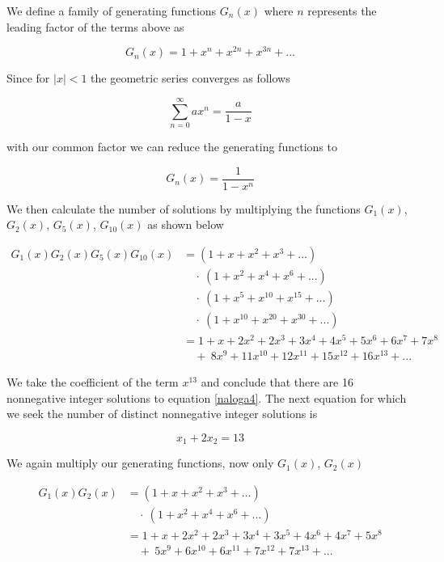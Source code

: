 \documentclass[a4paper]{article}
\begin{document}
\noindent
We define a family of generating functions $G_n(x)$ where $n$ represents the leading factor of the terms above as

\[
    G_n(x) = 1 + x^n + x^{2n} + x^{3n} + ...
\]

\noindent
Since for $|x| < 1$ the geometric series converges as follows

\[
    \sum_{n = 0}^{\infty} ax^n = \frac{a}{1 - x}
\]

\noindent
with our common factor we can reduce the generating functions to

\[
    G_n(x) = \frac{1}{1 - x^n}
\]

\noindent
We then calculate the number of solutions by multiplying the functions $G_1(x)$, $G_2(x)$, $G_5(x)$, $G_{10}(x)$ as shown below
\newpage

\begin{align*}
    G_1(x)G_2(x)G_5(x)G_{10}(x) &= (1 + x + x^{2} + x^{3} + ...)\\
                                &\quad\cdot\ (1 + x^2 + x^{4} + x^{6} + ...)\\
                                &\quad\cdot\ (1 + x^5 + x^{10} + x^{15} + ...)\\
                                &\quad\cdot\ (1 + x^10 + x^{20} + x^{30} + ...)\\
                                &= 1 + x + 2 x^2 + 2 x^3 + 3 x^4 + 4 x^5+ 5 x^6 + 6 x^7 + 7 x^8  \\
                                &\quad +\ 8 x^9  + 11 x^{10} + 12 x^{11}+ 15 x^{12} + 16 x^{13} +...
\end{align*}

We take the coefficient of the term $x^{13}$ and conclude that there are 16 nonnegative integer solutions to equation \ref{naloga4}. The next equation for
which we seek the number of distinct nonnegative integer solutions is 

\label{naloga4_2}
\begin{equation}
    x_1 + 2x_2 = 13
\end{equation}

\noindent
We again multiply our generating functions, now only $G_1(x)$, $G_2(x)$

\begin{align*}
    G_1(x)G_2(x)&= (1 + x + x^{2} + x^{3} + ...)\\
                &\quad\cdot\ (1 + x^2 + x^{4} + x^{6} + ...)\\
                &= 1 + x + 2 x^2 + 2 x^3 + 3 x^4 + 3 x^5+ 4 x^6 + 4 x^7 + 5 x^8  \\
                &\quad +\ 5 x^9  + 6 x^{10} + 6 x^{11}+ 7 x^{12} + 7 x^{13} +...
\end{align*}
\end{document}
